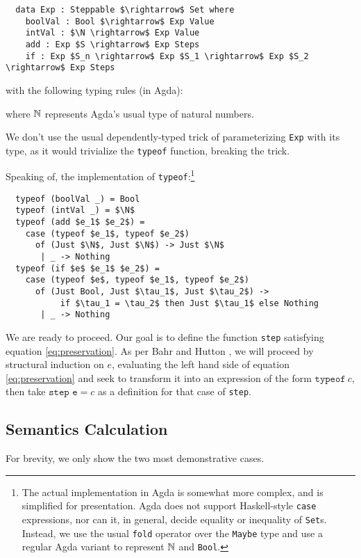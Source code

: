 \documentclass[manuscript,screen,review,sigplan]{acmart}
\begin{document}
\begin{lstlisting}
  data Exp : Steppable $\rightarrow$ Set where
    boolVal : Bool $\rightarrow$ Exp Value
    intVal : $\N \rightarrow$ Exp Value
    add : Exp $S \rightarrow$ Exp Steps
    if : Exp $S_n \rightarrow$ Exp $S_1 \rightarrow$ Exp $S_2 \rightarrow$ Exp Steps
\end{lstlisting}

with the following typing rules (in Agda):

where $\mathbb{N}$ represents Agda's usual type of natural numbers.

We don't use the usual dependently-typed trick of parameterizing
\texttt{Exp} with its type, as it would trivialize the \texttt{typeof}
function, breaking the trick.

Speaking of, the implementation of \texttt{typeof}:\footnote{The actual
implementation in Agda is somewhat more complex, and is simplified for
presentation. Agda does not support Haskell-style \texttt{case} expressions,
nor can it, in general, decide equality or inequality of \texttt{Set}s.
Instead, we use the usual \texttt{fold} operator over the \texttt{Maybe}
type and use a regular Agda variant to represent $\mathbb{N}$ and \texttt{Bool}.}

\begin{lstlisting}
  typeof (boolVal _) = Bool
  typeof (intVal _) = $\N$
  typeof (add $e_1$ $e_2$) =
    case (typeof $e_1$, typeof $e_2$)
      of (Just $\N$, Just $\N$) -> Just $\N$
       | _ -> Nothing
  typeof (if $e$ $e_1$ $e_2$) =
    case (typeof $e$, typeof $e_1$, typeof $e_2$)
      of (Just Bool, Just $\tau_1$, Just $\tau_2$) ->
           if $\tau_1 = \tau_2$ then Just $\tau_1$ else Nothing
       | _ -> Nothing
\end{lstlisting}

We are ready to proceed. Our goal is to define the function \texttt{step}
satisfying equation \ref{eq:preservation}. As per Bahr and Hutton
\cite{bahr:2015}, we will proceed by structural induction on $e$, evaluating
the left hand side of equation \ref{eq:preservation} and seek to transform it
into an expression of the form $\texttt{typeof}\ c$, then take $\texttt{step e}
= c$ as a definition for that case of \texttt{step}.

\subsection{Semantics Calculation}

For brevity, we only show the two most demonstrative cases.
\end{document}

